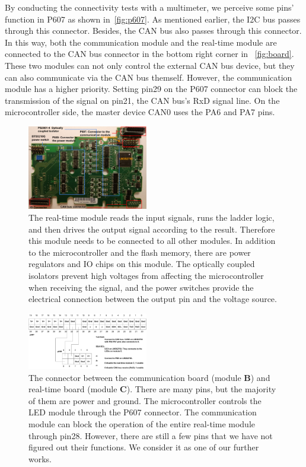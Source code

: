 By conducting the connectivity tests with a multimeter, we perceive some pins' function in P607 as shown in~\autoref{fig:p607}. As mentioned earlier, the I2C bus passes through this connector. Besides, the CAN bus also passes through this connector. In this way, both the communication module and the real-time module are connected to the CAN bus connector in the bottom right corner in ~\autoref{fig:board}. These two modules can not only control the external CAN bus device, but they can also communicate via the CAN bus themself. However, the communication module has a higher priority. Setting pin29 on the P607 connector can block the transmission of the signal on pin21, the CAN bus's RxD signal line. On the microcontroller side, the master device CAN0 uses the PA6 and PA7 pins. 


\begin{figure}[th]
	\includegraphics[width=0.47\textwidth]{figures/board3}
	\centering
	\caption{The real-time module reads the input signals, runs the ladder logic, and then drives the output signal according to the result. Therefore this module needs to be connected to all other modules. In addition to the microcontroller and the flash memory, there are power regulators and IO chips on this module. The optically coupled isolators prevent high voltages from affecting the microcontroller when receiving the signal, and the power switches provide the electrical connection between the output pin and the voltage source.}
	\label{fig:board}
\end{figure}


\begin{figure}[th]
	\includegraphics[width=0.47\textwidth]{figures/p607_2}
	\centering
	\caption{The connector between the communication board (module \textbf{B}) and real-time board (module \textbf{C}).  There are many pins, but the majority of them are power and ground. The microcontroller controls the LED module through the P607 connector.  The communication module can block the operation of the entire real-time module through pin28. However, there are still a few pins that we have not figured out their functions. We consider it as one of our further works.}
	\label{fig:p607}
\end{figure}

